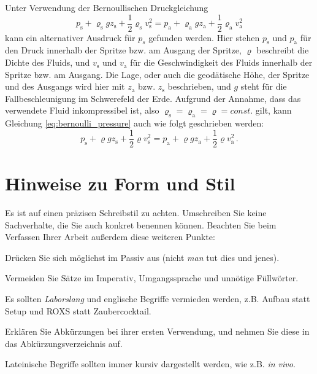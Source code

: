Unter Verwendung der Bernoullischen Druckgleichung
\begin{equation}
	\label{eq:bernoulli_pressure}
	p_{\text{s}} +  \varrho_{\text{s}} g z_{\text{s}} + \frac{1}{2} \varrho_{\text{s}} v^{2}_{\text{s}} = p_{\text{a}} + \varrho_{\text{a}} g z_{\text{a}} + \frac{1}{2} \varrho_{\text{a}} v^{2}_{\text{a}}
\end{equation}
kann ein alternativer Ausdruck für $ p_{s} $ gefunden werden. Hier stehen $ p_{\text{s}} $ und $ p_{\text{a}} $ für den Druck innerhalb der Spritze bzw. am Ausgang der Spritze, $ \varrho $ beschreibt die Dichte des Fluids, und $ v_{\text{s}} $ und $ v_{\text{a}} $ für die Geschwindigkeit des Fluids innerhalb der Spritze bzw. am Ausgang. 
Die Lage, oder auch die geodätische Höhe, der Spritze und des Ausgangs wird hier mit $ z_{\text{a}} $ bzw. $ z_{\text{s}} $ beschrieben, und $ g $ steht für die Fallbeschleunigung im Schwerefeld der Erde.
Aufgrund der Annahme, dass das verwendete Fluid inkompressibel ist, also $ \varrho_{\text{s}} = \varrho_{\text{a}} = \varrho = const. $ gilt, kann Gleichung \ref{eq:bernoulli_pressure} auch wie folgt geschrieben werden:
\begin{equation}
	\label{eq:bernoulli_pressure_rearranged}
p_{\text{s}} +  \varrho g z_{\text{s}} + \frac{1}{2} \varrho v^{2}_{\text{s}} = p_{\text{a}} + \varrho g z_{\text{a}} + \frac{1}{2} \varrho v^{2}_{\text{a}} \, .
\end{equation}

\section{Hinweise zu Form und Stil}

Es ist auf einen präzisen Schreibstil zu achten. Umschreiben Sie keine Sachverhalte, die Sie auch konkret benennen können. Beachten Sie beim Verfassen Ihrer Arbeit außerdem diese weiteren Punkte:

\begin{compactitem}
	\item Drücken Sie sich möglichst im Passiv aus (nicht \frqq\textit{man} tut dies und jenes\flqq{}).
	\item Vermeiden Sie Sätze im Imperativ, Umgangssprache und unnötige Füllwörter.
	\item Es sollten \textit{Laborslang }und englische Begriffe vermieden werden, z.B. \frqq Aufbau\flqq{} statt \frqq Setup\flqq{} und \frqq ROXS\flqq{}  statt \frqq Zaubercocktail\flqq.
	\item Erklären Sie Abkürzungen bei ihrer ersten Verwendung, und nehmen Sie diese in das Abkürzungsverzeichnis auf.
	\item Lateinische Begriffe sollten immer kursiv dargestellt werden, wie z.B. \textit{in vivo}.
\end{compactitem}
